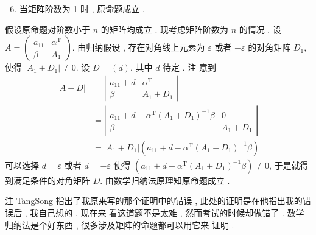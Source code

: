 \documentclass[10pt]{article}
\begin{document}
\begin{enumerate}
  \setcounter{enumi}{5}
  \item  当矩阵阶数为  1  时 ,  原命题成立 .
\end{enumerate}
 假设原命题对阶数小于  $n$  的矩阵均成立 .  现考虑矩阵阶数为  $n$  的情况 .  设  $A=\left(\begin{array}{cc}a_{11} & \alpha^{\mathrm{T}} \\ \beta & A_{1}\end{array}\right)$.  由归纳假设 ,  存在对角线上元素为  $\varepsilon$  或者  $-\varepsilon$  的对角矩阵  $D_{1}$,  使得  $\left|A_{1}+D_{1}\right| \neq 0$.  设  $D=(d)$,  其中  $d$  待定 .  注   意到 
$$
\begin{aligned}
|A+D| &=\left|\begin{array}{cc}
a_{11}+d & \alpha^{\mathrm{T}} \\
\beta & A_{1}+D_{1}
\end{array}\right| \\
&=\left|\begin{array}{cc}
a_{11}+d-\alpha^{\mathrm{T}}\left(A_{1}+D_{1}\right)^{-1} \beta & 0 \\
\beta & A_{1}+D_{1}
\end{array}\right| \\
&=\left|A_{1}+D_{1}\right|\left(a_{11}+d-\alpha^{\mathrm{T}}\left(A_{1}+D_{1}\right)^{-1} \beta\right)
\end{aligned}
$$
 可以选择  $d=\varepsilon$  或者  $d=-\varepsilon$  使得  $\left(a_{11}+d-\alpha^{\mathrm{T}}\left(A_{1}+D_{1}\right)^{-1} \beta\right) \neq 0$,  于是就得到满足条件的对角矩阵  $D$.  由数学归纳法原理知原命题成立 .

 注  TangSong  指出了我原来写的那个证明中的错误 ,  此处的证明是在他指出我的错误后 ,  我自己想的 .  现在来   看这道题不是太难 ,  然而考试的时候却做错了 .  数学归纳法是个好东西 ,  很多涉及矩阵的命题都可以用它来   证明 .
\end{document}
